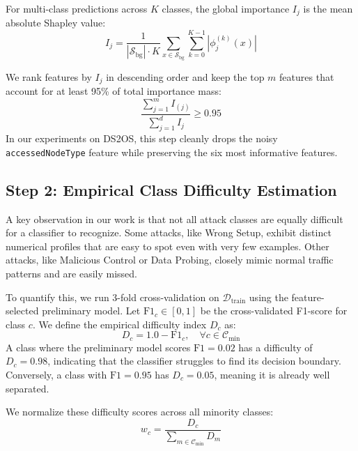 For multi-class predictions across $K$ classes, the global importance $I_j$ is the mean absolute Shapley value:
\begin{equation}
I_j = \frac{1}{|\mathcal{S}_{\text{bg}}| \cdot K} \sum_{x \in \mathcal{S}_{\text{bg}}} \sum_{k=0}^{K-1} \left| \phi_j^{(k)}(x) \right|
\label{eq:mean_shap}
\end{equation}

We rank features by $I_j$ in descending order and keep the top $m$ features that account for at least 95\% of total importance mass:
\begin{equation}
\frac{\sum_{j=1}^{m} I_{(j)}}{\sum_{j=1}^{d} I_j} \ge 0.95
\label{eq:selection_threshold}
\end{equation}
In our experiments on DS2OS, this step cleanly drops the noisy \texttt{accessedNodeType} feature while preserving the six most informative features.

\subsection{Step 2: Empirical Class Difficulty Estimation}
A key observation in our work is that not all attack classes are equally difficult for a classifier to recognize. Some attacks, like Wrong Setup, exhibit distinct numerical profiles that are easy to spot even with very few examples. Other attacks, like Malicious Control or Data Probing, closely mimic normal traffic patterns and are easily missed.

To quantify this, we run 3-fold cross-validation on $\mathcal{D}_{\text{train}}$ using the feature-selected preliminary model. Let $\text{F1}_c \in [0, 1]$ be the cross-validated F1-score for class $c$. We define the empirical difficulty index $D_c$ as:
\begin{equation}
D_c = 1.0 - \text{F1}_c, \quad \forall c \in \mathcal{C}_{\text{min}}
\label{eq:difficulty}
\end{equation}
A class where the preliminary model scores $\text{F1}=0.02$ has a difficulty of $D_c = 0.98$, indicating that the classifier struggles to find its decision boundary. Conversely, a class with $\text{F1}=0.95$ has $D_c = 0.05$, meaning it is already well separated.

We normalize these difficulty scores across all minority classes:
\begin{equation}
w_c = \frac{D_c}{\sum_{m \in \mathcal{C}_{\text{min}}} D_m}
\label{eq:normalized_weight}
\end{equation}

